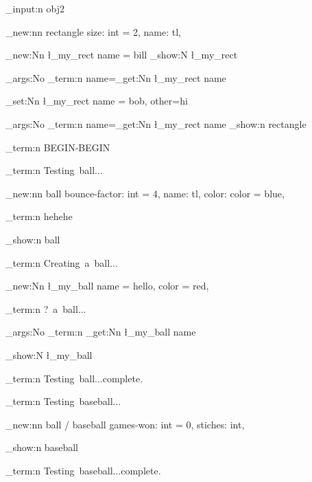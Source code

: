 \nonstopmode  \relax \ExplSyntaxOn %


\file_input:n { obj2 }

\obj_new:nn { rectangle }
  {
    size: int = 2,
    name: tl,
  }

\rectangle_new:Nn \l_my_rect
  { name = bill }
\prop_show:N \l_my_rect

\exp_args:No \msg_term:n { name=\rectangle_get:Nn \l_my_rect {name} }

\rectangle_set:Nn \l_my_rect { name = bob, other=hi }

\exp_args:No \msg_term:n { name=\rectangle_get:Nn \l_my_rect {name} }
\obj_show:n { rectangle }

\msg_term:n {BEGIN-BEGIN}


\msg_term:n { Testing~ball... }

\obj_new:nn { ball }
  {
    bounce-factor: int = 4,
    name: tl,
    color: color = blue,
  }

\msg_term:n {hehehe}

\obj_show:n { ball }


\msg_term:n { Creating~a~ball... }

\ball_new:Nn \l_my_ball
  {
    name = hello,
    color = red,
  }

\msg_term:n { ?~a~ball... }

\exp_args:No \msg_term:n { \ball_get:Nn \l_my_ball { name } }

\ball_show:N \l_my_ball

\msg_term:n { Testing~ball...complete. }


\msg_term:n { Testing~baseball... }

\obj_new:nn { ball / baseball }
  {
    games-won: int = 0,
    stiches: int,
  }

\obj_show:n { baseball }

\msg_term:n { Testing~baseball...complete. }


\bye
